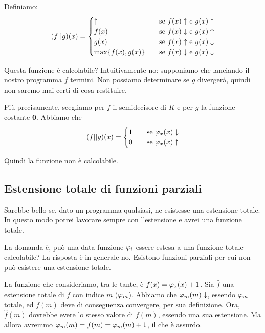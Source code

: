 Definiamo:
\begin{equation*}
    (f || g)(x) =
    \begin{cases}
        \uparrow \quad &\text{se $f(x) \uparrow$ e $g(x) \uparrow$} \\
        f(x) \quad &\text{se $f(x) \downarrow$ e $g(x) \uparrow$} \\
        g(x) \quad &\text{se $f(x) \uparrow$ e $g(x) \downarrow$} \\
        \max\{f(x),g(x)\} \quad &\text{se $f(x) \downarrow$ e $g(x) \downarrow$}
    \end{cases}
\end{equation*}

Questa funzione è calcolabile? Intuitivamente no: supponiamo che lanciando il nostro programma $f$ 
termini. Non possiamo determinare se $g$ divergerà, quindi non saremo mai certi di cosa restituire.

Più precisamente, scegliamo per $f$ il semidecisore di $K$ e per $g$ la funzione costante $\bm{0}$.
Abbiamo che
\begin{equation*}
    (f || g)(x) =
    \begin{cases}
        1 \quad &\text{se $\varphi_{x}(x)\downarrow$}\\
        0 \quad &\text{se $\varphi_{x}(x)\uparrow$}\\
    \end{cases}
\end{equation*}

Quindi la funzione non è calcolabile.

\subsection{Estensione totale di funzioni parziali}

Sarebbe bello se, dato un programma qualsiasi, ne esistesse una estensione totale. In questo modo
potrei lavorare sempre con l'estensione e avrei una funzione totale.

La domanda è, può una data funzione $\varphi_{i}$ essere estesa a una funzione totale calcolabile? La
risposta è in generale no. Esistono funzioni parziali per cui non può esistere una estensione
totale.

La funzione che consideriamo, tra le tante, è $f(x) = \varphi_{x}(x) + 1$. Sia $\hat{f}$ una estensione
totale di $f$ con indice $m$ ($\varphi_{m}$). Abbiamo che $\varphi_{m}(m) \downarrow$, essendo $\varphi_{m}$ totale,
ed $f(m)$ deve di conseguenza convergere, per sua definizione. Ora, $\hat{f}(m)$ dovrebbe evere lo
stesso valore di $f(m)$, essendo una sua estensione. Ma allora avremmo $\varphi_{m}(m) = f(m) = \varphi_{m}(m) +
1$, il che è assurdo.


